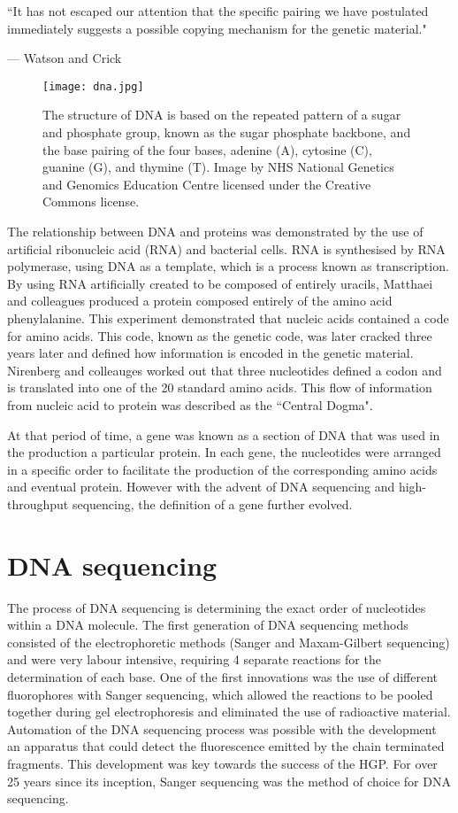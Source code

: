 \epigraph{``It has not escaped our attention that the specific pairing we have postulated immediately suggests a possible copying mechanism for the genetic material."}{--- \textup{Watson and Crick}}

\begin{figure}[h]
   \centering
   \texttt{[image: dna.jpg]}
   \caption[The structure of DNA]{The structure of DNA is based on the repeated pattern of a sugar and phosphate group, known as the sugar phosphate backbone, and the base pairing of the four bases, adenine (A), cytosine (C), guanine (G), and thymine (T). Image by NHS National Genetics and Genomics Education Centre licensed under the Creative Commons license.}
   \label{fig:dna}
\end{figure}

The relationship between DNA and proteins was demonstrated by the use of artificial ribonucleic acid (RNA) and bacterial cells\cite{pmid14471390}. RNA is synthesised by RNA polymerase, using DNA as a template, which is a process known as transcription. By using RNA artificially created to be composed of entirely uracils, Matthaei and colleagues produced a protein composed entirely of the amino acid phenylalanine. This experiment demonstrated that nucleic acids contained a code for amino acids. This code, known as the genetic code, was later cracked three years later\cite{pmid5330357} and defined how information is encoded in the genetic material. Nirenberg and colleauges worked out that three nucleotides defined a codon and is translated into one of the 20 standard amino acids. This flow of information from nucleic acid to protein was described as the ``Central Dogma"\cite{crick1958protein}.

At that period of time, a gene was known as a section of DNA that was used in the production a particular protein. In each gene, the nucleotides were arranged in a specific order to facilitate the production of the corresponding amino acids and eventual protein. However with the advent of DNA sequencing and high-throughput sequencing, the definition of a gene further evolved.

\section{DNA sequencing}

The process of DNA sequencing is determining the exact order of nucleotides within a DNA molecule. The first generation of DNA sequencing methods consisted of the electrophoretic methods (Sanger and Maxam-Gilbert sequencing) and were very labour intensive, requiring 4 separate reactions for the determination of each base. One of the first innovations was the use of different fluorophores with Sanger sequencing, which allowed the reactions to be pooled together during gel electrophoresis and eliminated the use of radioactive material. Automation of the DNA sequencing process was possible with the development an apparatus that could detect the fluorescence emitted by the chain terminated fragments. This development was key towards the success of the HGP. For over 25 years since its inception, Sanger sequencing was the method of choice for DNA sequencing.

